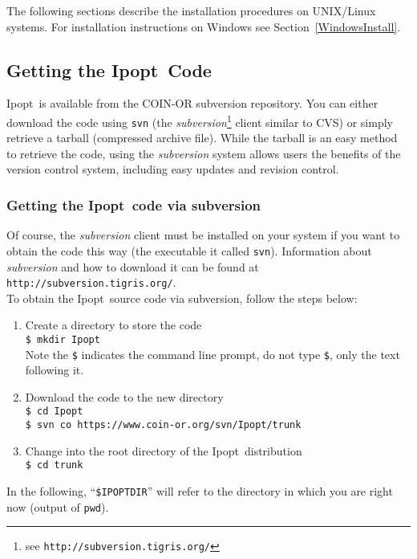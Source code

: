 \documentclass[letter,10pt]{article}
\newcommand{\Ipopt}{{\sc Ipopt}}
\begin{document}
The following sections describe the installation procedures on
UNIX/Linux systems.  For installation instructions on Windows
see Section~\ref{WindowsInstall}.

\subsection{Getting the \Ipopt\ Code}
\Ipopt\ is available from the COIN-OR subversion repository. You can
either download the code using \texttt{svn} (the
\textit{subversion}\footnote{see
  \texttt{http://subversion.tigris.org/}} client similar to CVS) or
simply retrieve a tarball (compressed archive file).  While the
tarball is an easy method to retrieve the code, using the
\textit{subversion} system allows users the benefits of the version
control system, including easy updates and revision control.

\subsubsection{Getting the \Ipopt\ code via subversion}

Of course, the \textit{subversion} client must be installed on your
system if you want to obtain the code this way (the executable it
called \texttt{svn}).  Information about \textit{subversion} and how
to download it can be found at \texttt{http://subversion.tigris.org/}.\\

To obtain the \Ipopt\ source code via subversion, follow the steps
below:
\begin{enumerate}
\item{Create a directory to store the code}\\
{\tt \$ mkdir Ipopt}\\ 
Note the {\tt \$} indicates the command line
prompt, do not type {\tt \$}, only the text following it.
\item{Download the code to the new directory}\\
{\tt \$ cd Ipopt\\
\$ svn co https://www.coin-or.org/svn/Ipopt/trunk}
\item Change into the root directory of the \Ipopt\ distribution\\
{\tt \$ cd trunk}
\end{enumerate}

In the following, ``\texttt{\$IPOPTDIR}'' will refer to the directory in
which you are right now (output of \texttt{pwd}).
\end{document}
